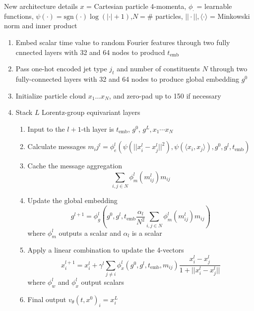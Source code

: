 \documentclass[handout, aspectratio=169,xcolor=dvipsnames]{beamer}
\begin{document}
\begin{frame}[allowframebreaks]{New architecture details}
    $x$ = Cartesian particle 4-momenta, $\phi_\cdot$ = learnable functions, $\psi(\cdot) = \text{sgn}(\cdot) \log(|\cdot| + 1)$,$N = \#$ particles, $|| \cdot ||, \langle \cdot \rangle$ = Minkowski norm and inner product
    \begin{enumerate}
        \item Embed scalar time value to random Fourier features through two fully cnnected layers with 32 and 64 nodes to producd $t_\text{emb}$
        \item Pass one-hot encoded jet type $j_t$ and number of constituents $N$ through two fully-connected layers with 32 and 64 nodes to produce global embedding $g^0$
        \item Initialize particle cloud $x_1 \dots x_N$, and zero-pad up to 150 if necessary
        \item Stack $L$ Lorentz-group equivariant layers \begin{enumerate}
            \item Input to the $l+1$-th layer is $t_\text{emb}$, $g^0$, $g^L, x_1 \cdots x_N$
            \item Calculate messages $m_ij^l = \phi_e^l(\psi(||x_i^l - x_j^l||^2), \psi(\langle x_i, x_j \rangle), g^0, g^l, t_\text{emb})$
            \item Cache the message aggregation $$\sum\limits_{i, j \in N} \phi_m^l(m_{ij}^l) m_{ij} $$
            \item Update the global embedding $$g^{l+1} = \phi_g^l \left(g^0, g^l, t_\text{emb} \frac{\alpha_l}{N^2} \sum\limits_{i, j \in N} \phi_m^l(m_{ij}^l) m_{ij}  \right)$$ where $\phi_m^l$ outputs a scalar and $\alpha_l$ is a scalar
            \item Apply a linear combination to update the 4-vectors $$x_i^{l+1} = x_i^l + \gamma^l \sum\limits_{j \neq i} \phi_x^l (g^0, g^l, t_\text{emb}, m_{ij}) \frac{x_i^l - x_j^l}{1 + ||x_i^l - x_j^l||} $$  where $\phi_w^l$ and $\phi_x^l$ output scalars
            \item Final output $v_\theta(t, x^0)_i = x_i^L$
        \end{enumerate}
    \end{enumerate}
\end{frame}
\end{document}
